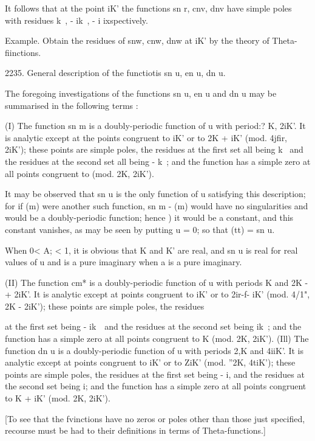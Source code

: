 It follows that at the point iK' the functions sn r, cnv, dnv have
simple poles with residues k~, - ik~, - i ixspectively.

Example. Obtain the residues of snw, cnw, dnw at iK' by the theory of
Theta- fiinctions.

2235. General description of the functiotis sn u, en u, dn u.

The foregoing investigations of the functions sn u, en u and dn u may
be summarised in the following terms :

(I) The function sn m is a doubly-periodic function of u with period:?
K, 2iK'. It is analytic except at the points congruent to iK' or to 2K
+ iK' (mod. 4jfir, 2iK'); these points are simple poles, the residues
at the first set all being k~ and the residues at the second set all
being - k~; and the function has a simple zero at all points
congruent to (mod. 2K, 2iK').

It may be observed that sn u is the only function of u satisfying this
description; for if (m) were another such function, sn m - (m) would
have no singularities and would be a doubly-periodic function; hence
) it would be a constant, and this constant vanishes, as may
be seen by putting u = 0; so that (tt) = sn u.

When 0< A; < 1, it is obvious that K and K' are real, and sn u is real
for real values of u and is a pure imaginary when a is a pure
imaginary.

(II) The function cm* is a doubly-periodic function of u with periods
K and 2K -+ 2iK'. It is analytic except at points congruent to iK' or
to 2ir-f- iK' (mod. 4/1", 2K - 2iK'); these points are simple poles,
the residues

%
%

at the first set being - ik~\ and the residues at the second set being
ik~; and the function has a simple zero at all points congruent to K
(mod. 2K, 2iK'). (Ill) The function dn u is a doubly-periodic function
of u with periods 2,K and 4iiK'. It is analytic except at points
congruent to iK' or to ZiK' (mod. ''2K, 4tiK'); these points are
simple poles, the residues at the first set being - i, and the
residues at the second set being i; and the function has a simple
zero at all points congruent to K + iK' (mod. 2K, 2iK').

[To see that the fvinctions have no zeros or poles other than those
just specified, recourse must be had to their definitions in terms of
Theta-functions.]

